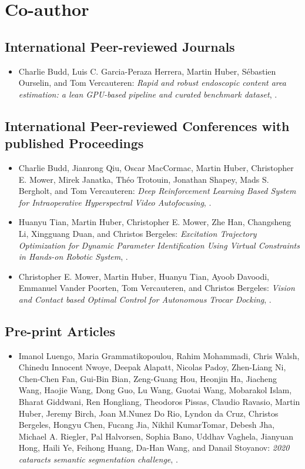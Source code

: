 \section{Co-author}
\subsection{International Peer-reviewed Journals}
\begin{itemize}
    \item Charlie Budd, Luis C. Garcia-Peraza Herrera, Martin Huber, S\'{e}bastien Ourselin, and Tom Vercauteren: \textit{Rapid and robust endoscopic content area estimation: a lean GPU-based pipeline and curated benchmark dataset}, \cite{budd2022rapid}.   
\end{itemize}

\subsection[International Peer-reviewed Conferences]{International Peer-reviewed Conferences with published Proceedings}
\begin{itemize}
    \item Charlie Budd, Jianrong Qiu, Oscar MacCormac, Martin Huber, Christopher E. Mower, Mirek Janatka, Th{\'e}o Trotouin, Jonathan Shapey, Mads S. Bergholt, and Tom Vercauteren: \textit{Deep Reinforcement Learning Based System for Intraoperative Hyperspectral Video Autofocusing}, \cite{budd2023deep}.
    \item Huanyu Tian, Martin Huber, Christopher E. Mower, Zhe Han, Changsheng Li, Xingguang Duan, and Christos Bergeles: \textit{Excitation Trajectory Optimization for Dynamic Parameter Identification Using Virtual Constraints in Hands-on Robotic System}, \cite{tian2024excitation}.
    \item Christopher E. Mower, Martin Huber, Huanyu Tian, Ayoob Davoodi, Emmanuel Vander Poorten, Tom Vercauteren, and Christos Bergeles: \textit{Vision and Contact based Optimal Control for Autonomous Trocar Docking}, \cite{mowervision}.
\end{itemize}

\subsection{Pre-print Articles}
\begin{itemize}
    \item Imanol Luengo, Maria Grammatikopoulou, Rahim Mohammadi, Chris Walsh, Chinedu Innocent Nwoye, Deepak Alapatt, Nicolas Padoy, Zhen-Liang Ni, Chen-Chen Fan, Gui-Bin Bian, Zeng-Guang Hou, Heonjin Ha, Jiacheng Wang, Haojie Wang, Dong Guo, Lu Wang, Guotai Wang, Mobarakol Islam, Bharat Giddwani, Ren Hongliang, Theodoros Pissas, Claudio Ravasio, Martin Huber, Jeremy Birch, Joan M.Nunez Do Rio, Lyndon da Cruz, Christos Bergeles, Hongyu Chen, Fucang Jia, Nikhil KumarTomar, Debesh Jha, Michael A. Riegler, Pal Halvorsen, Sophia Bano, Uddhav Vaghela, Jianyuan Hong, Haili Ye, Feihong Huang, Da-Han Wang, and Danail Stoyanov: \textit{2020 cataracts semantic segmentation challenge}, \cite{luengo20212020}.
\end{itemize}
